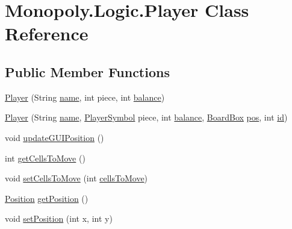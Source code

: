 \hypertarget{class_monopoly_1_1_logic_1_1_player}{}\section{Monopoly.\+Logic.\+Player Class Reference}
\label{class_monopoly_1_1_logic_1_1_player}
\subsection*{Public Member Functions}
\begin{DoxyCompactItemize}
\item 
\hyperlink{class_monopoly_1_1_logic_1_1_player_ae03fd34bc6503a939b2b85f763e0ae7e}{Player} (String \hyperlink{class_monopoly_1_1_logic_1_1_player_ac9a1abcd87e522434ec657f541c69647}{name}, int piece, int \hyperlink{class_monopoly_1_1_logic_1_1_player_adee3b4a4dea242b17568e6d93922a698}{balance})
\item 
\hyperlink{class_monopoly_1_1_logic_1_1_player_a9982c0f955a39716b9f2d0bcc4179203}{Player} (String \hyperlink{class_monopoly_1_1_logic_1_1_player_ac9a1abcd87e522434ec657f541c69647}{name}, \hyperlink{class_monopoly_1_1_logic_1_1_player_symbol}{Player\+Symbol} piece, int \hyperlink{class_monopoly_1_1_logic_1_1_player_adee3b4a4dea242b17568e6d93922a698}{balance}, \hyperlink{class_monopoly_1_1_logic_1_1_board_box}{Board\+Box} \hyperlink{class_monopoly_1_1_logic_1_1_player_a94388e91629f1f055fed991fd202e1b8}{pos}, int \hyperlink{class_monopoly_1_1_logic_1_1_player_a30de4a228019d4020511fb2f573901dd}{id})
\item 
void \hyperlink{class_monopoly_1_1_logic_1_1_player_a1bb5cf33a38b1fe7984d23b632ce48fc}{update\+G\+U\+I\+Position} ()
\item 
int \hyperlink{class_monopoly_1_1_logic_1_1_player_ac0dd44eebc83dba1281e36c359a646ed}{get\+Cells\+To\+Move} ()
\item 
void \hyperlink{class_monopoly_1_1_logic_1_1_player_ad3b5177a7efbe8e2e6854d9c9c8e2c2c}{set\+Cells\+To\+Move} (int \hyperlink{class_monopoly_1_1_logic_1_1_player_a9b17ab340918d686bcca176f7d4da366}{cells\+To\+Move})
\item 
\hyperlink{class_monopoly_1_1_logic_1_1_position}{Position} \hyperlink{class_monopoly_1_1_logic_1_1_player_ae8cbf81d19475e0d7bf009adfffa2bf8}{get\+Position} ()
\item 
void \hyperlink{class_monopoly_1_1_logic_1_1_player_a55cc4fd74bb775780681e5f9bd4e00cf}{set\+Position} (int x, int y)
\item 

\end{DoxyCompactItemize}
